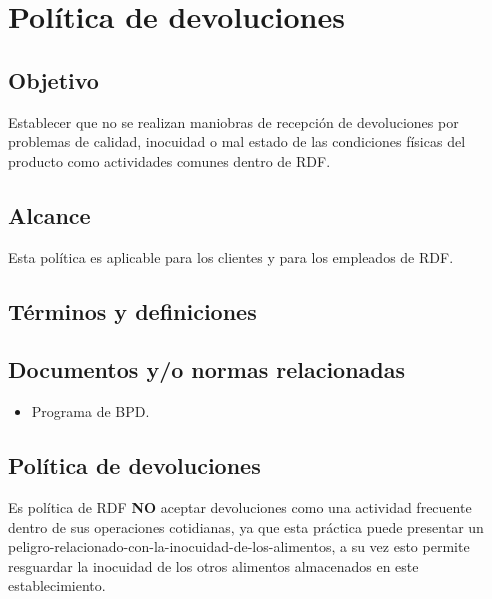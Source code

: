 \thispagestyle{formato-PI}
\renewcommand{\MayorVer}{2}
\renewcommand{\MenorVer}{0}
\renewcommand{\Codigo}{PSA-1-PROG} %
\renewcommand{\FechaPub}{2023--01}
\renewcommand{\Titulo}{Política de devoluciones}

\section{\Titulo}


\subsection{Objetivo}

Establecer que no se realizan maniobras de recepción de devoluciones por problemas de calidad, inocuidad o mal estado de las condiciones físicas del producto como actividades comunes dentro de \gls{RDF}.

\subsection{Alcance}

Esta política es aplicable para los clientes y para los empleados de \gls{RDF}.

\subsection{Términos y definiciones}

\begin{description}
\end{description}

\subsection{Documentos y/o normas relacionadas}
\begin{itemize}
	\item Programa de \gls{BPD}.
\end{itemize}

\subsection{Política de devoluciones}
Es política de \gls{RDF} \textbf{NO} aceptar devoluciones como una actividad frecuente dentro de sus operaciones cotidianas, ya que esta práctica puede presentar un \gls{peligro-relacionado-con-la-inocuidad-de-los-alimentos}, a su vez esto permite resguardar la inocuidad de los otros \glspl{alimento} almacenados en este establecimiento.


